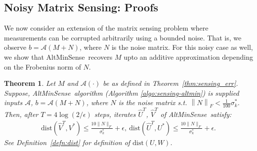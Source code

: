 \documentclass[11pt]{article}
\theoremstyle{plain}
\newtheorem{theorem}{Theorem}[section]
\theoremstyle{definition}
\newcommand{\rmn}{\mathbb{R}^{m \times n}}
\newcommand{\dist}{\mathrm{dist}}
\newcommand{\calA}{\mathcal{A}}
\newcommand{\aff}{{\mathcal A}}
\newcommand{\Un}{U^N}
\newcommand{\Vn}{V^N}
\newcommand{\Sn}{\Sigma^N}
\newcommand{\sn}{\sigma^N}
\newcommand{\so}{\sigma^*}
\newcommand{\as}{AltMinSense\ }
\newcommand{\Vw}{\widehat{V}}
\newcommand{\Uw}{\widehat{U}}
\begin{document}
\subsection{Noisy Matrix Sensing: Proofs}\label{app:noisy_sensing}
We now consider an extension of the matrix sensing problem where measurements can be corrupted arbitrarily using a bounded noise. That is, we 
observe $b=\aff\left(M+N\right)$, where $N$ is the noise matrix. %
For this noisy case as well, we show that \as recovers $M$ upto an additive approximation depending on the Frobenius norm of  $N$. 
\begin{theorem}\label{thm:sensing-noisycase}
 Let $M$ and $\calA(\cdot)$ be as defined in Theorem~\ref{thm:sensing_err}. Suppose, \as algorithm (Algorithm \ref{algo:sensing-altmin}) is supplied inputs $\aff$, $b=\aff(M+N)$, where $N$ is the noise matrix s.t. $\left\|N\right\|_F  < \frac{1}{100}\so_k$.  Then, after $T=4\log(2/\epsilon)$ steps, iterates $\widehat{U}^{T}$, $\widehat{V}^{T}$ of \as  satisfy: 
\begin{align*}
  \dist\left(\Vw^{T},V^*\right) \leq \frac{10\|N\|_F}{\so_k} + \epsilon, \ 
  \dist\left(\Uw^{T},U^*\right) \leq \frac{10\|N\|_F}{\so_k} + \epsilon.
\end{align*}
See Definition~\ref{defn:dist} for definition of $\dist\left(U, W\right)$. 
\end{theorem}
\end{document}

